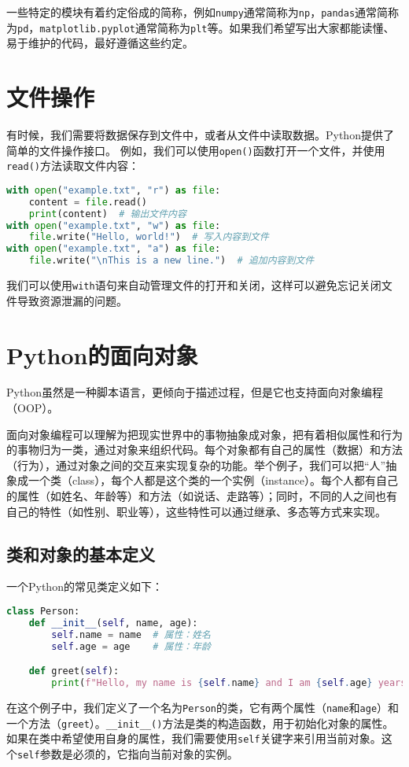 一些特定的模块有着约定俗成的简称，例如\texttt{numpy}通常简称为\texttt{np}，\texttt{pandas}通常简称为\texttt{pd}，\texttt{matplotlib.pyplot}通常简称为\texttt{plt}等。如果我们希望写出大家都能读懂、易于维护的代码，最好遵循这些约定。

\section{文件操作}

有时候，我们需要将数据保存到文件中，或者从文件中读取数据。Python提供了简单的文件操作接口。
例如，我们可以使用\texttt{open()}函数打开一个文件，并使用\texttt{read()}方法读取文件内容：
\begin{lstlisting}[language=python]
with open("example.txt", "r") as file:
    content = file.read()
    print(content)  # 输出文件内容
with open("example.txt", "w") as file:
    file.write("Hello, world!")  # 写入内容到文件
with open("example.txt", "a") as file:
    file.write("\nThis is a new line.")  # 追加内容到文件
\end{lstlisting}

我们可以使用\texttt{with}语句来自动管理文件的打开和关闭，这样可以避免忘记关闭文件导致资源泄漏的问题。

\section{Python的面向对象}

Python虽然是一种脚本语言，更倾向于描述过程，但是它也支持面向对象编程（OOP）。

面向对象编程可以理解为把现实世界中的事物抽象成对象，把有着相似属性和行为的事物归为一类，通过对象来组织代码。每个对象都有自己的属性（数据）和方法（行为），通过对象之间的交互来实现复杂的功能。举个例子，我们可以把“人”抽象成一个类（class），每个人都是这个类的一个实例（instance）。每个人都有自己的属性（如姓名、年龄等）和方法（如说话、走路等）；同时，不同的人之间也有自己的特性（如性别、职业等），这些特性可以通过继承、多态等方式来实现。

\subsection{类和对象的基本定义}
一个Python的常见类定义如下：
\begin{lstlisting}[language=python]
class Person:
    def __init__(self, name, age):
        self.name = name  # 属性：姓名
        self.age = age    # 属性：年龄

    def greet(self):
        print(f"Hello, my name is {self.name} and I am {self.age} years old.")
\end{lstlisting}
在这个例子中，我们定义了一个名为\texttt{Person}的类，它有两个属性（\texttt{name}和\texttt{age}）和一个方法（\texttt{greet}）。\texttt{\_\_init\_\_()}方法是类的构造函数，用于初始化对象的属性。如果在类中希望使用自身的属性，我们需要使用\texttt{self}关键字来引用当前对象。这个\texttt{self}参数是必须的，它指向当前对象的实例。

